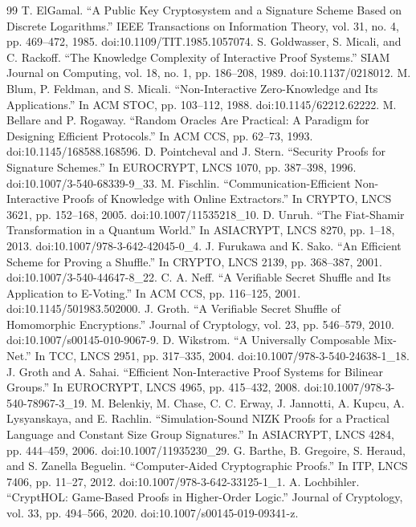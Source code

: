 \documentclass[11pt]{article}
\begin{document}
\begin{thebibliography}{99}
 T. ElGamal. “A Public Key Cryptosystem and a Signature Scheme Based on Discrete Logarithms.” IEEE Transactions on Information Theory, vol. 31, no. 4, pp. 469–472, 1985. doi:10.1109/TIT.1985.1057074.
 S. Goldwasser, S. Micali, and C. Rackoff. “The Knowledge Complexity of Interactive Proof Systems.” SIAM Journal on Computing, vol. 18, no. 1, pp. 186–208, 1989. doi:10.1137/0218012.
 M. Blum, P. Feldman, and S. Micali. “Non-Interactive Zero-Knowledge and Its Applications.” In ACM STOC, pp. 103–112, 1988. doi:10.1145/62212.62222.
 M. Bellare and P. Rogaway. “Random Oracles Are Practical: A Paradigm for Designing Efficient Protocols.” In ACM CCS, pp. 62–73, 1993. doi:10.1145/168588.168596.
 D. Pointcheval and J. Stern. “Security Proofs for Signature Schemes.” In EUROCRYPT, LNCS 1070, pp. 387–398, 1996. doi:10.1007/3-540-68339-9\_33.
 M. Fischlin. “Communication-Efficient Non-Interactive Proofs of Knowledge with Online Extractors.” In CRYPTO, LNCS 3621, pp. 152–168, 2005. doi:10.1007/11535218\_10.
 D. Unruh. “The Fiat-Shamir Transformation in a Quantum World.” In ASIACRYPT, LNCS 8270, pp. 1–18, 2013. doi:10.1007/978-3-642-42045-0\_4.
 J. Furukawa and K. Sako. “An Efficient Scheme for Proving a Shuffle.” In CRYPTO, LNCS 2139, pp. 368–387, 2001. doi:10.1007/3-540-44647-8\_22.
 C. A. Neff. “A Verifiable Secret Shuffle and Its Application to E-Voting.” In ACM CCS, pp. 116–125, 2001. doi:10.1145/501983.502000.
 J. Groth. “A Verifiable Secret Shuffle of Homomorphic Encryptions.” Journal of Cryptology, vol. 23, pp. 546–579, 2010. doi:10.1007/s00145-010-9067-9.
 D. Wikstrom. “A Universally Composable Mix-Net.” In TCC, LNCS 2951, pp. 317–335, 2004. doi:10.1007/978-3-540-24638-1\_18.
 J. Groth and A. Sahai. “Efficient Non-Interactive Proof Systems for Bilinear Groups.” In EUROCRYPT, LNCS 4965, pp. 415–432, 2008. doi:10.1007/978-3-540-78967-3\_19.
 M. Belenkiy, M. Chase, C. C. Erway, J. Jannotti, A. Kupcu, A. Lysyanskaya, and E. Rachlin. “Simulation-Sound NIZK Proofs for a Practical Language and Constant Size Group Signatures.” In ASIACRYPT, LNCS 4284, pp. 444–459, 2006. doi:10.1007/11935230\_29.
 G. Barthe, B. Gregoire, S. Heraud, and S. Zanella Beguelin. “Computer-Aided Cryptographic Proofs.” In ITP, LNCS 7406, pp. 11–27, 2012. doi:10.1007/978-3-642-33125-1\_1.
 A. Lochbihler. “CryptHOL: Game-Based Proofs in Higher-Order Logic.” Journal of Cryptology, vol. 33, pp. 494–566, 2020. doi:10.1007/s00145-019-09341-z.

\end{thebibliography}
\end{document}
